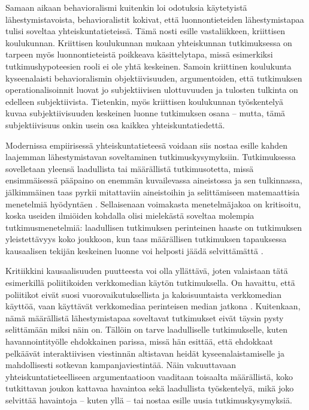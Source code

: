 \documentclass[finnish,gradu,twoside,12pt]{tktltiki}
\begin{document}
Samaan aikaan behavioralismi kuitenkin loi odotuksia käytetyistä lähestymistavoista, behavioralistit kokivat, että luonnontieteiden lähestymistapaa tulisi soveltaa yhteiskuntatieteissä. Tämä nosti esille vastaliikkeen, kriittisen koulukunnan. Kriittisen koulukunnan mukaan yhteiskunnan tutkimuksessa on tarpeen myös luonnontieteistä poikkeava käsittelytapa, missä esimerkiksi tutkimushypoteesien rooli ei ole yhtä keskeinen. Samoin kriittinen koulukunta kyseenalaisti behavioralismin objektiivisuuden, argumentoiden, että tutkimuksen operationalisoinnit luovat jo subjektiivisen ulottuvuuden ja tulosten tulkinta on edelleen subjektiivista. Tietenkin, myös kriittisen koulukunnan työskentelyä kuvaa subjektiivisuuden keskeinen luonne tutkimuksen osana -- mutta, tämä subjektiivisuus onkin usein osa kaikkea yhteiskuntatiedettä.

Modernissa empiirisessä yhteiskuntatieteesä voidaan siis nostaa esille kahden laajemman lähestymistavan soveltaminen tutkimuskysymyksiin. Tutkimuksessa sovelletaan yleensä laadullista tai määrällistä tutkimusotetta, missä ensimmäisessä pääpaino on enemmän kuvailevassa aineistossa ja sen tulkinnassa, jälkimmäinen taas pyrkii mitattaviin aineistoihin ja selittämiseen matemaattisia menetelmiä hyödyntäen \citep{a,b}. Sellaisenaan voimakasta menetelmäjakoa on kritisoitu, koska useiden ilmiöiden kohdalla olisi mielekästä soveltaa molempia tutkimusmenetelmiä: laadullisen tutkimuksen perinteinen haaste on tutkimuksen yleistettävyys koko joukkoon, kun taas määrällisen tutkimuksen tapauksessa kausaalisen tekijän keskeinen luonne voi helposti jäädä selvittämättä \citep{a,b,c}.

Kritiikkini kausaalisuuden puutteesta voi olla yllättävä, joten valaistaan tätä esimerkillä poliitikoiden verkkomedian käytön tutkimuksella. On havaittu, että poliitikot eivät suosi vuorovaikutuksellista ja kaksisuuntaista verkkomedian käyttöä, vaan käyttävät verkkomediaa perinteisen median jatkona \citep{Golbeck2010}. Kuitenkaan, nämä määrällistä lähestymistapaa soveltavat tutkimukset eivät täysin pysty selittämään miksi näin on. Tällöin on tarve laadulliselle tutkimukselle, kuten \citet{Stromer-Galley2000} havannointityölle ehdokkainen parissa, missä hän esittää, että ehdokkaat pelkäävät interaktiivisen viestinnän altistavan heidät kyseenalaistamiselle ja mahdollisesti sotkevan kampanjaviestintää. Näin vakuuttavaan yhteiskuntatieteelliseen argumentaatioon vaaditaan toisaalta määrällistä, koko tutkittavan joukon kattavaa havaintoa sekä laadullista työskentelyä, mikä joko selvittää havaintoja -- kuten yllä -- tai nostaa esille uusia tutkimuskysymyksiä.
\end{document}
